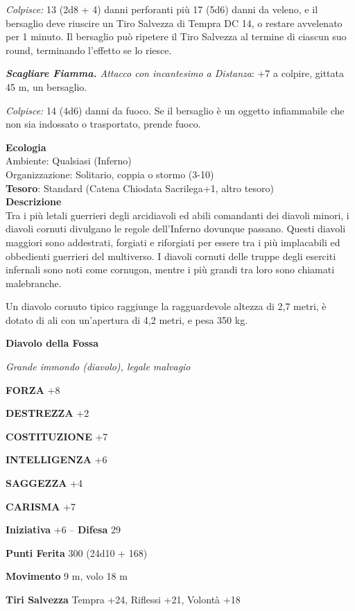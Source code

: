 \begin{multicols}{2}
\textit{Colpisce:} 13 (2d8 + 4) danni perforanti più 17 (5d6) danni da veleno, e il bersaglio deve riuscire un Tiro Salvezza di Tempra DC 14, o restare avvelenato per 1 minuto. Il bersaglio può ripetere il Tiro Salvezza al termine di ciascun suo round, terminando l'effetto se lo
riesce.

\textit{\textbf{Scagliare Fiamma.} Attacco con incantesimo a Distanza}: +7 a colpire, gittata 45 m, un bersaglio.

\textit{Colpisce:} 14 (4d6) danni da fuoco. Se il bersaglio è un oggetto infiammabile che non sia indossato o trasportato, prende fuoco.

\textbf{Ecologia}\\
Ambiente: Qualsiasi (Inferno)\\
Organizzazione: Solitario, coppia o stormo (3-10)\\
\textbf{Tesoro}: Standard (Catena Chiodata Sacrilega+1, altro tesoro)\\
\textbf{Descrizione}\\
Tra i più letali guerrieri degli arcidiavoli ed abili comandanti dei diavoli minori, i diavoli cornuti divulgano le regole dell'Inferno dovunque passano. Questi diavoli maggiori sono addestrati, forgiati e riforgiati per essere tra i più implacabili ed obbedienti guerrieri del multiverso. I diavoli cornuti delle truppe degli eserciti infernali sono noti come cornugon, mentre i più grandi tra loro sono chiamati malebranche.

Un diavolo cornuto tipico raggiunge la ragguardevole altezza di 2,7 metri, è dotato di ali con un'apertura di 4,2 metri, e pesa 350 kg.


\medskip{}\textbf{Diavolo della Fossa}\hypertarget{diavolodellafossa}{}

\textit{Grande immondo (diavolo), legale malvagio}

\textbf{FORZA} +8

\textbf{DESTREZZA} +2

\textbf{COSTITUZIONE} +7

\textbf{INTELLIGENZA} +6

\textbf{SAGGEZZA} +4

\textbf{CARISMA} +7

\textbf{Iniziativa} +6 -- \textbf{Difesa} 29

\textbf{Punti Ferita} 300 (24d10 + 168)

\textbf{Movimento} 9 m, volo 18 m

\textbf{Tiri Salvezza} Tempra +24, Riflessi +21, Volontà +18


\end{multicols}
